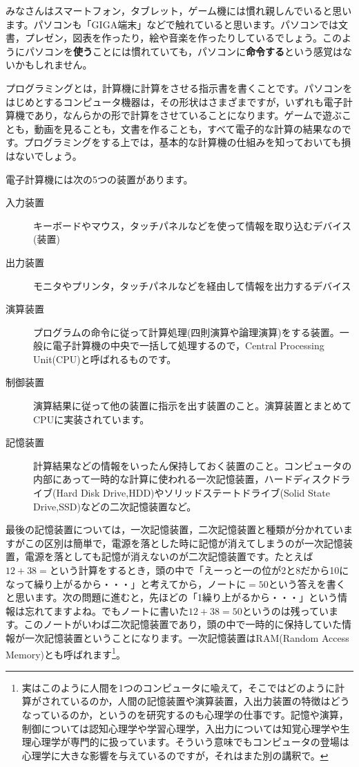 \documentclass{ltjsbook}
\begin{document}
みなさんはスマートフォン，タブレット，ゲーム機には慣れ親しんでいると思います。パソコンも「GIGA端末」などで触れていると思います。パソコンでは文書，プレゼン，図表を作ったり，絵や音楽を作ったりしているでしょう。このようにパソコンを\textbf{使う}ことには慣れていても，パソコンに\textbf{命令する}という感覚はないかもしれません。

プログラミングとは，計算機に計算をさせる指示書を書くことです。パソコンをはじめとするコンピュータ機器は，その形状はさまざまですが，いずれも電子計算機であり，なんらかの形で計算をさせていることになります。ゲームで遊ぶことも，動画を見ることも，文書を作ることも，すべて電子的な計算の結果なのです。プログラミングをする上では，基本的な計算機の仕組みを知っておいても損はないでしょう。

電子計算機には次の5つの装置があります。

\begin{description}
	\item[入力装置] キーボードやマウス，タッチパネルなどを使って情報を取り込むデバイス(装置)
	\item[出力装置] モニタやプリンタ，タッチパネルなどを経由して情報を出力するデバイス
	\item[演算装置] プログラムの命令に従って計算処理(四則演算や論理演算)をする装置。一般に電子計算機の中央で一括して処理するので，Central Processing Unit(CPU)と呼ばれるものです。
	\item[制御装置] 演算結果に従って他の装置に指示を出す装置のこと。演算装置とまとめてCPUに実装されています。
	\item[記憶装置] 計算結果などの情報をいったん保持しておく装置のこと。コンピュータの内部にあって一時的な計算に使われる一次記憶装置，ハードディスクドライブ(Hard Disk Drive,HDD)やソリッドステートドライブ(Solid State Drive,SSD)などの二次記憶装置など。
\end{description}

最後の記憶装置については，一次記憶装置，二次記憶装置と種類が分かれていますがこの区別は簡単で，電源を落とした時に記憶が消えてしまうのが一次記憶装置，電源を落としても記憶が消えないのが二次記憶装置です。たとえば$12+38=$という計算をするとき，頭の中で「えーっと一の位が2と8だから10になって繰り上がるから・・・」と考えてから，ノートに$=50$という答えを書くと思います。次の問題に進むと，先ほどの「1繰り上がるから・・・」という情報は忘れてますよね。でもノートに書いた$12+38=50$というのは残っています。このノートがいわば二次記憶装置であり，頭の中で一時的に保持していた情報が一次記憶装置ということになります。一次記憶装置はRAM(Random Access Memory)とも呼ばれます\footnote{実はこのように人間を1つのコンピュータに喩えて，そこではどのように計算がされているのか，人間の記憶装置や演算装置，入出力装置の特徴はどうなっているのか，というのを研究するのも心理学の仕事です。記憶や演算，制御については認知心理学や学習心理学，入出力については知覚心理学や生理心理学が専門的に扱っています。そういう意味でもコンピュータの登場は心理学に大きな影響を与えているのですが，それはまた別の講釈で。}。
\end{document}

